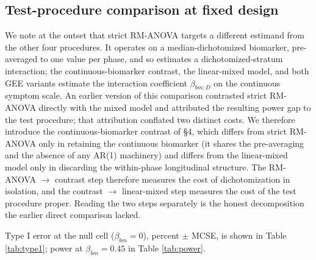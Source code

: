 \documentclass[
  11pt,
]{article}
\begin{document}
\subsection{Test-procedure comparison at fixed design}\label{test-procedure-comparison-at-fixed-design}

We note at the outset that strict RM-ANOVA targets a different
estimand from the other four procedures. It operates on a
median-dichotomized biomarker, pre-averaged to one value per
phase, and so estimates a dichotomized-stratum interaction; the
continuous-biomarker contrast, the linear-mixed model, and both
GEE variants estimate the interaction coefficient
\(\beta_{bm:D}\) on the continuous symptom scale. An earlier
version of this comparison contrasted strict RM-ANOVA directly
with the mixed model and attributed the resulting power gap to
the test procedure; that attribution conflated two distinct
costs. We therefore introduce the continuous-biomarker contrast
of \S4, which differs from strict RM-ANOVA only in retaining the
continuous biomarker (it shares the pre-averaging and the absence
of any AR(1) machinery) and differs from the linear-mixed model
only in discarding the within-phase longitudinal structure. The
RM-ANOVA \(\to\) contrast step therefore measures the cost of
dichotomization in isolation, and the contrast \(\to\) linear-mixed
step measures the cost of the test procedure proper. Reading the
two steps separately is the honest decomposition the earlier
direct comparison lacked.

Type I error at the null cell (\(\beta_{bm} = 0\)), percent \(\pm\)
MCSE, is shown in Table \ref{tab:type1}; power at
\(\beta_{bm} = 0.45\) in Table \ref{tab:power}.
\end{document}
